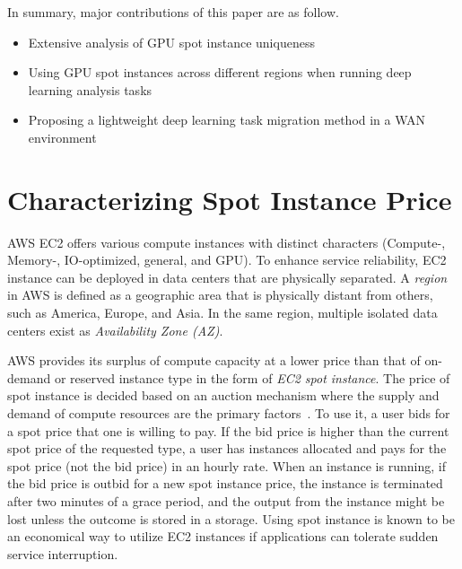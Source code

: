 \documentclass[conference]{IEEEtran}
\begin{document}
In summary, major contributions of this paper are as follow.
\begin{itemize}
    \item{Extensive analysis of GPU spot instance uniqueness}
    \item{Using GPU spot instances across different regions when running deep learning analysis tasks}
    \item{Proposing a lightweight deep learning task migration method in a WAN environment}
\end{itemize}

\section{Characterizing Spot Instance Price}\label{sec:character}
AWS EC2 offers various compute instances with distinct characters (Compute-, Memory-, IO-optimized, general, and GPU). To enhance service reliability, EC2 instance can be deployed in data centers that are physically separated. A \emph{region} in AWS is defined as a geographic area that is physically distant from others, such as America, Europe, and Asia. In the same region, multiple isolated data centers exist as \emph{Availability Zone (AZ)}. 

AWS provides its surplus of compute capacity at a lower price than that of on-demand or reserved instance type in the form of \emph{EC2 spot instance}. The price of spot instance is decided based on an auction mechanism where the supply and demand of compute resources are the primary factors~\cite{spot-instance-pricing-analysis}. To use it, a user bids for a spot price that one is willing to pay. If the bid price is higher than the current spot price of the requested type, a user has instances allocated and pays for the spot price (not the bid price) in an hourly rate. When an instance is running, if the bid price is outbid for a new spot instance price, the instance is terminated after two minutes of a grace period, and the output from the instance might be lost unless the outcome is stored in a storage. Using spot instance is known to be an economical way to utilize EC2 instances if applications can tolerate sudden service interruption.
\end{document}

